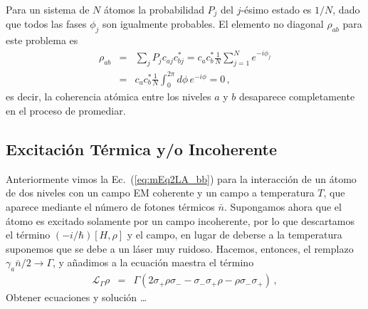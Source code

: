 \documentclass[twocolumn,aps,eqsecnum]{revtex4}
\begin{document}
Para un sistema de $N$ \'atomos la probabilidad $P_j$ del $j$-\'esimo estado 
es $1/N$, dado que todos las fases $\phi_j$ son igualmente probables. El 
elemento no diagonal $\rho_{ab}$ para este problema es 
%
\begin{eqnarray*}
\rho_{ab} &=& \sum_j P_j c_{aj} c_{bj}^\ast 
	= c_a c_b^\ast \frac{1}{N} \sum_{j=1}^N e^{-i \phi_j} 	\\ 
	&=& c_a c_b^\ast \frac{1}{N}  \int_0^{2\pi} d\phi \, e^{-i \phi} = 0 \,,
\end{eqnarray*}
es decir, la coherencia at\'omica entre los niveles $a$ y $b$ desaparece 
completamente en el proceso de promediar. 

\subsection{Excitaci\'on T\'ermica y/o Incoherente} 
Anteriormente vimos la Ec.~(\ref{eq:mEq2LA_bb}) para la interacci\'on 
de un \'atomo de dos niveles con un campo EM coherente y un campo a  
temperatura $T$, que aparece mediante el n\'umero de fotones t\'ermicos 
$\bar{n}$. Supongamos ahora que el \'atomo es excitado solamente por 
un campo incoherente, por lo que descartamos el t\'ermino 
$(-i/\hbar)[H,\rho]$ y el campo, en lugar de deberse a la temperatura 
suponemos que se debe a un l\'aser muy ruidoso. Hacemos, entonces, 
el remplazo $\gamma_a \bar{n}/2 \to \Gamma$, y a\~nadimos a la 
ecuaci\'on maestra el t\'ermino
%
\begin{eqnarray} 	\label{eq:mEq2LA_inc}
\mathcal{L}_{\Gamma} \rho &=& \Gamma   \left( 2 \sigma_+ \rho \sigma_- 
	-\sigma_- \sigma_+ \rho -\rho \sigma_- \sigma_+ \right)\,, 
\end{eqnarray}
Obtener ecuaciones y soluci\'on \ldots

\end{document}
